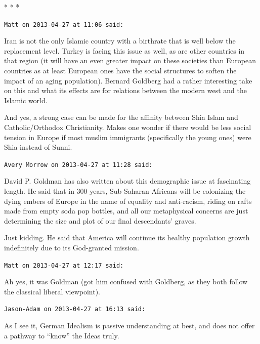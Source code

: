 
\begin{center}* * *\end{center}

\begin{footnotesize}
\begin{sffamily}
\texttt{Matt on 2013-04-27 at 11:06 said:}

Iran is not the only Islamic country with a birthrate that is well below the replacement level. Turkey is facing this issue as well, as are other countries in that region (it will have an even greater impact on these societies than European countries as at least European ones have the social structures to soften the impact of an aging population). Bernard Goldberg had a rather interesting take on this and what its effects are for relations between the modern west and the Islamic world.

And yes, a strong case can be made for the affinity between Shia Islam and Catholic/Orthodox Christianity. Makes one wonder if there would be less social tension in Europe if most muslim immigrants (specifically the young ones) were Shia instead of Sunni.

\hfill

\texttt{Avery Morrow on 2013-04-27 at 11:28 said:}

David P. Goldman has also written about this demographic issue at fascinating length. He said that in 300 years, Sub-Saharan Africans will be colonizing the dying embers of Europe in the name of equality and anti-racism, riding on rafts made from empty soda pop bottles, and all our metaphysical concerns are just determining the size and plot of our final descendants' graves.

Just kidding. He said that America will continue its healthy population growth indefinitely due to its God-granted mission.

\hfill

\texttt{Matt on 2013-04-27 at 12:17 said:}

Ah yes, it was Goldman (got him confused with Goldberg, as they both follow the classical liberal viewpoint).

\hfill

\texttt{Jason-Adam on 2013-04-27 at 16:13 said:}

As I see it, German Idealism is passive understanding at best, and does not offer a pathway to ``know'' the Ideas truly.

\hfill


\end{sffamily}
\end{footnotesize}
